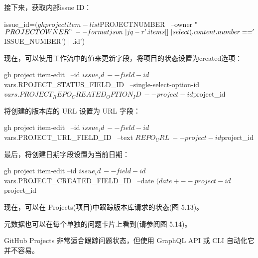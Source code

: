 接下来，获取内部issue ID：

\begin{shell}
issue_id=$(gh project item-list $PROJECTNUMBER \
  --owner "$PROJECTOWNER" \
  --format json \
  | jq -r '.items[] \
  | select(.content.number=='$ISSUE_NUMBER') | .id')
\end{shell}

现在，可以使用工作流中的值来更新字段，将项目的状态设置为created选项：

\begin{shell}
gh project item-edit \
  --id $issue_id \
  --field-id ${{ vars.RPOJECT_STATUS_FIELD_ID }} \
  --single-select-option-id ${{ vars.PROJECT_REPO_CREATED_OPTION_ID }} \
  --project-id $project_id
\end{shell}

将创建的版本库的 URL 设置为 URL 字段：

\begin{shell}
gh project item-edit \
  --id $issue_id \
  --field-id ${{ vars.PROJECT_URL_FIELD_ID }} \
  --text $REPO_URL \
  --project-id $project_id
\end{shell}

最后，将创建日期字段设置为当前日期：

\begin{shell}
gh project item-edit --id $issue_id \
  --field-id ${{ vars.PROJECT_CREATED_FIELD_ID }} \
  --date $(date +%
  --project-id $project_id
\end{shell}

现在，可以在 Projects(项目)中跟踪版本库请求的状态(图 5.13)。


元数据也可以在每个单独的问题卡片上看到(请参阅图 5.14)。


GitHub Projects 非常适合跟踪问题状态，但使用 GraphQL API 或 CLI 自动化它并不容易。































